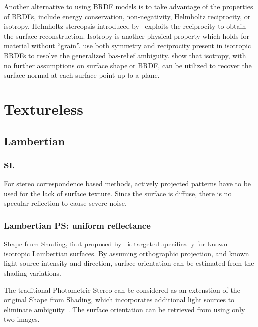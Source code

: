 Another alternative to using BRDF models is to take advantage of the properties of BRDFs, include energy conservation, non-negativity, Helmholtz reciprocity, or isotropy. Helmholtz stereopsis introduced by~\citeauthor{zickler2002helmholtz} exploits the reciprocity to obtain the surface reconstruction. Isotropy is another physical property which holds for material without ``grain''. \citeauthor{tan2007isotropy} use both symmetry and reciprocity present in isotropic BRDFs to resolve the generalized bas-relief ambiguity. \citeauthor{alldrin2007toward} show that isotropy, with no further assumptions on surface shape or BRDF, can be utilized to recover the surface normal at each surface point up to a plane.

\section{Textureless}
\subsection{Lambertian}
\subsubsection{SL}
For stereo correspondence based methods, actively projected patterns have to be used for the lack of surface texture. Since the surface is diffuse, there is no specular reflection to cause severe noise.

\subsubsection{Lambertian PS: uniform reflectance}
Shape from Shading, first proposed by~\citeauthor{horn1970shape} is targeted specifically for known isotropic Lambertian surfaces. By assuming orthographic projection, and known light source intensity and direction, surface orientation can be estimated from the shading variations.

The traditional Photometric Stereo can be considered as an extenstion of the original Shape from Shading, which incorporates additional light sources to eliminate ambiguity~\cite{woodham1980photometric}. The surface orientation can be retrieved from using only two images.

